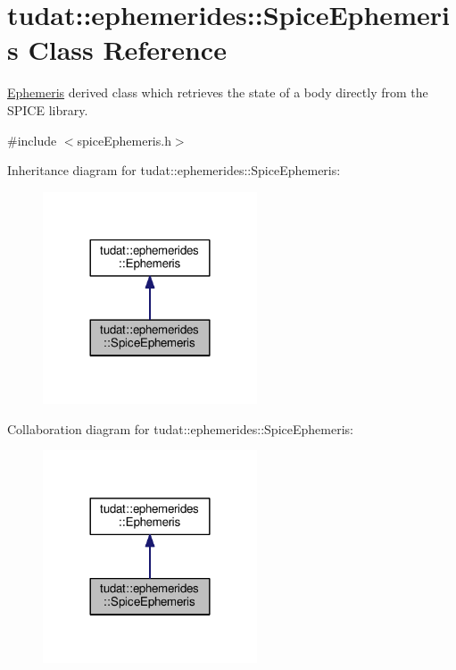 \hypertarget{classtudat_1_1ephemerides_1_1SpiceEphemeris}{}\section{tudat\+:\+:ephemerides\+:\+:Spice\+Ephemeris Class Reference}
\label{classtudat_1_1ephemerides_1_1SpiceEphemeris}


\hyperlink{classtudat_1_1ephemerides_1_1Ephemeris}{Ephemeris} derived class which retrieves the state of a body directly from the S\+P\+I\+CE library.  




{\ttfamily \#include $<$spice\+Ephemeris.\+h$>$}



Inheritance diagram for tudat\+:\+:ephemerides\+:\+:Spice\+Ephemeris\+:
\nopagebreak
\begin{figure}[H]
\begin{center}
\leavevmode
\includegraphics[width=180pt]{classtudat_1_1ephemerides_1_1SpiceEphemeris__inherit__graph}
\end{center}
\end{figure}


Collaboration diagram for tudat\+:\+:ephemerides\+:\+:Spice\+Ephemeris\+:
\nopagebreak
\begin{figure}[H]
\begin{center}
\leavevmode
\includegraphics[width=180pt]{classtudat_1_1ephemerides_1_1SpiceEphemeris__coll__graph}
\end{center}
\end{figure}
